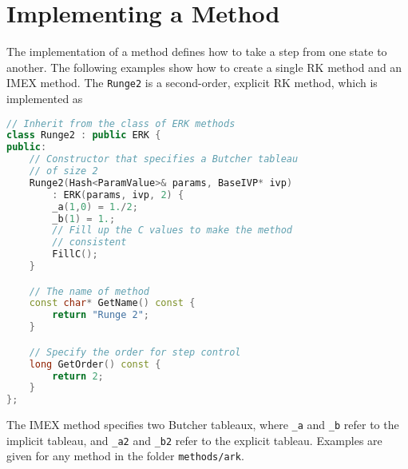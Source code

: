 \documentclass[11pt]{article}
\begin{document}
\section{Implementing a Method}

The implementation of a method defines how to take a step from one state to another. The following examples show how to create a single RK method and an IMEX method. The \verb=Runge2= is a second-order, explicit RK method, which is implemented as
\begin{lstlisting}[tabsize=4,language=c++]
// Inherit from the class of ERK methods
class Runge2 : public ERK {
public:
	// Constructor that specifies a Butcher tableau
	// of size 2
	Runge2(Hash<ParamValue>& params, BaseIVP* ivp)
		: ERK(params, ivp, 2) {
		_a(1,0) = 1./2;
		_b(1) = 1.;
		// Fill up the C values to make the method
		// consistent
		FillC();
	}

	// The name of method
	const char* GetName() const {
		return "Runge 2";
	}

	// Specify the order for step control	
	long GetOrder() const {
		return 2;
	}
};
\end{lstlisting}

The IMEX method specifies two Butcher tableaux, where \verb=_a= and \verb=_b= refer to the implicit tableau, and \verb=_a2= and \verb=_b2= refer to the explicit tableau. Examples are given for any method in the folder \verb=methods/ark=.



\end{document}
